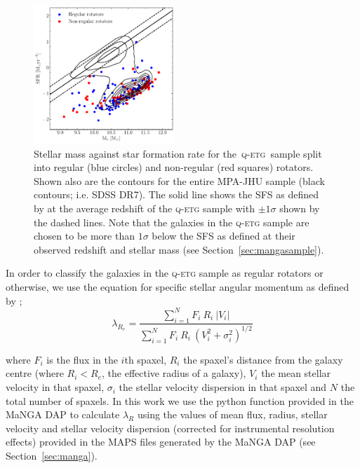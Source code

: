 \documentclass[useAMS,usenatbib]{mn2e}
\begin{document}
\begin{figure}
\centering
\includegraphics[width=0.475\textwidth]{../figures/nonSF_FR_SR_SFS_scatter.pdf}
\caption{Stellar mass against star formation rate for the~\textsc{q-etg}~sample split into regular (blue circles) and non-regular (red squares) rotators. Shown also are the contours for the entire MPA-JHU sample (black contours; i.e. SDSS DR7). The solid line shows the SFS as defined by \cite{peng10} at the average redshift of the \textsc{q-etg} sample with $\pm1\sigma$ shown by the dashed lines. Note that the galaxies in the \textsc{q-etg} sample are chosen to be more than $1\sigma$ below the SFS as defined at their observed redshift and stellar mass (see Section~\ref{sec:mangasample}).}
\label{fig:masvsfr}
\end{figure}

In order to classify the galaxies in the \textsc{q-etg} sample as regular rotators or otherwise, we use the equation for specific stellar angular momentum as defined by \cite{emsellem07, emsellem11};
\begin{equation}
\lambda_R_e = \frac{\sum_{i=1}^{N} F_i\ R_i\ |V_i|}{\sum_{i=1}^{N} F_i\ R_i\ (V_i^2 + \sigma_i^2)^{1/2}}
\end{equation}	

where $F_i$ is the flux in the $i$th spaxel, $R_i$ the spaxel's distance from the galaxy centre (where $R_i < R_e$, the effective radius of a galaxy), $V_i$ the mean stellar velocity in that spaxel, $\sigma_i$ the stellar velocity dispersion in that spaxel and $N$ the total number of spaxels. In this work we use the python function provided in the MaNGA DAP to calculate $\lambda_R$ using the values of mean flux, radius, stellar velocity and stellar velocity dispersion (corrected for instrumental resolution effects) provided in the MAPS files generated by the MaNGA DAP (see Section~\ref{sec:manga}).
\end{document}
